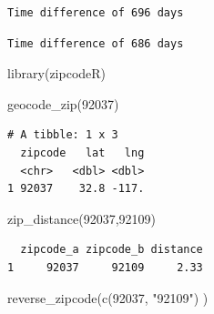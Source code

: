 \documentclass[
  letterpaper,
  DIV=11,
  numbers=noendperiod]{scrartcl}
\newenvironment{Shaded}{\begin{snugshade}}{\end{snugshade}}
\newcommand{\DecValTok}[1]{\textcolor[rgb]{0.68,0.00,0.00}{#1}}
\newcommand{\FunctionTok}[1]{\textcolor[rgb]{0.28,0.35,0.67}{#1}}
\newcommand{\NormalTok}[1]{\textcolor[rgb]{0.00,0.23,0.31}{#1}}
\newcommand{\SpecialCharTok}[1]{\textcolor[rgb]{0.37,0.37,0.37}{#1}}
\newcommand{\StringTok}[1]{\textcolor[rgb]{0.13,0.47,0.30}{#1}}
\begin{document}
\begin{verbatim}
Time difference of 696 days
\end{verbatim}

\begin{Shaded}
\end{Shaded}

\begin{verbatim}
Time difference of 686 days
\end{verbatim}

\begin{Shaded}
\begin{Highlighting}[]
\FunctionTok{library}\NormalTok{(zipcodeR)}
\end{Highlighting}
\end{Shaded}

\begin{Shaded}
\begin{Highlighting}[]
\FunctionTok{geocode\_zip}\NormalTok{(}\StringTok{\textquotesingle{}92037\textquotesingle{}}\NormalTok{)}
\end{Highlighting}
\end{Shaded}

\begin{verbatim}
# A tibble: 1 x 3
  zipcode   lat   lng
  <chr>   <dbl> <dbl>
1 92037    32.8 -117.
\end{verbatim}

\begin{Shaded}
\begin{Highlighting}[]
\FunctionTok{zip\_distance}\NormalTok{(}\StringTok{\textquotesingle{}92037\textquotesingle{}}\NormalTok{,}\StringTok{\textquotesingle{}92109\textquotesingle{}}\NormalTok{)}
\end{Highlighting}
\end{Shaded}

\begin{verbatim}
  zipcode_a zipcode_b distance
1     92037     92109     2.33
\end{verbatim}

\begin{Shaded}
\begin{Highlighting}[]
\FunctionTok{reverse\_zipcode}\NormalTok{(}\FunctionTok{c}\NormalTok{(}\StringTok{\textquotesingle{}92037\textquotesingle{}}\NormalTok{, }\StringTok{"92109"}\NormalTok{) )}
\end{Highlighting}
\end{Shaded}
\end{document}
